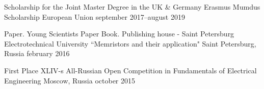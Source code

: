 

\begin{cventries}

  \cventry
  	{Scholarship for the Joint Master Degree in the UK \& Germany}
  	{Erasmus Mumdus Scholarship}
    {European Union}
    {september 2017--august 2019}
    {}
  \vspace{\acvSectionContentTopSkip}
  \vspace{-8mm}

  \cventry
  	{Paper. Young Scientists Paper Book. Publishing house - Saint Petersburg Electrotechnical University}
  	{``Memristors and their application"}
    {Saint Petersburg, Russia}
    {february 2016}
    {}
  \vspace{\acvSectionContentTopSkip}
  \vspace{-8mm}

  \cventry
  	{First Place}
  	{XLIV-s All-Russian Open Competition in Fundamentals of Electrical Engineering}
    {Moscow, Russia}
    {october 2015}
    {}
  \vspace{\acvSectionContentTopSkip}
  \vspace{-8mm}


\end{cventries}
